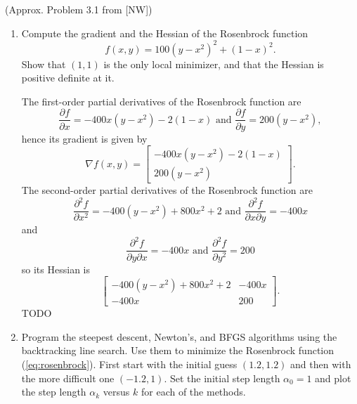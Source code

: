 \documentclass{../kin_math}
\begin{document}
\begin{questions}
  \question (Approx. Problem 3.1 from [NW])
  \begin{enumerate}
    \item Compute the gradient and the Hessian of the Rosenbrock function
    \begin{equation}
      \label{eq:rosenbrock}
      f(x, y) = 100(y - x^2)^2 + (1 - x)^2.
    \end{equation}
    Show that $(1, 1)$ is the only local minimizer, and that the Hessian is positive definite at it.
    \begin{solution}
      The first-order partial derivatives of the Rosenbrock function are
      \begin{equation*}
        \frac{\partial f}{\partial x} = -400x(y - x^2) - 2(1 - x) \text{ and } \frac{\partial f}{\partial y} = 200(y - x^2),
      \end{equation*}
      hence its gradient is given by
      \begin{equation*}
        \nabla f(x, y) = \begin{bmatrix} -400x(y - x^2) - 2(1 - x) \\ 200(y - x^2) \end{bmatrix}.
      \end{equation*}
      The second-order partial derivatives of the Rosenbrock function are
      \begin{equation*}
        \frac{\partial^2 f}{\partial x^2} = -400(y - x^2) + 800x^2 + 2 \text{ and } \frac{\partial^2 f}{\partial x \partial y} = -400x
      \end{equation*}
      and
      \begin{equation*}
        \frac{\partial^2 f}{\partial y \partial x} = -400x \text{ and } \frac{\partial^2 f}{\partial y^2} = 200
      \end{equation*}
      so its Hessian is
      \begin{equation*}
        \begin{bmatrix}
          -400(y - x^2) + 800x^2 + 2 & -400x \\ -400x & 200
        \end{bmatrix}.
      \end{equation*}
      TODO
    \end{solution}
    \item Program the steepest descent, Newton's, and BFGS algorithms using the backtracking line search. Use them to minimize the Rosenbrock function (\ref{eq:rosenbrock}). First start with the initial guess $(1.2, 1.2)$ and then with the more difficult one $(-1.2, 1)$. Set the initial step length $\alpha_0 = 1$ and plot the step length $\alpha_k$ versus $k$ for each of the methods.


\end{enumerate}
\end{questions}
\end{document}
